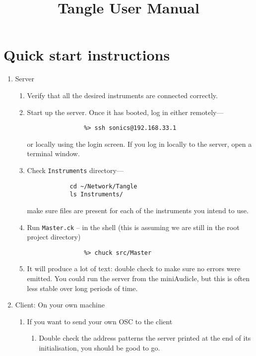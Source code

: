 \documentclass[11pt]{article}
\begin{document}
\title{Tangle User Manual}
\maketitle

\tableofcontents
\newpage
\section{Quick start instructions}
\begin{enumerate} [\bf 1.]
\item {\large Server}
	\begin{enumerate} [\bf i.]

		\item{Verify that all the desired instruments are connected correctly.}
		\item{Start up the server. Once it has booted, log in either remotely---
		\begin{verbatim}
			    %> ssh sonics@192.168.33.1
		\end{verbatim}                                 
		or locally using the login screen. If you log in locally to the server, open a terminal window.}
		\item{Check \texttt{Instruments} directory---
		\begin{verbatim}
			cd ~/Network/Tangle
			ls Instruments/
		\end{verbatim}
		make sure files are present for each of the instruments you intend to use.}
		\item Run \texttt{Master.ck} -- in the shell (this is assuming we are still in the root project directory)
		\begin{verbatim}
			    %> chuck src/Master
		\end{verbatim}
		\item  It will produce a lot of text: double check to make sure no errors were emitted. You could run the 
			  server from the miniAudicle, but this is often less stable over long periods of time.
	\end{enumerate}
\item {\large Client: On your own machine}
	\begin{enumerate} [\bf i.]
		\item {If you want to send your own OSC to the client}
		\begin{enumerate} [\bf a.]
			\item{Double check the address patterns the server printed at the end of its initialisation, you should be good to go.}

\end{enumerate}
\end{enumerate}
\end{enumerate}
\end{document}
